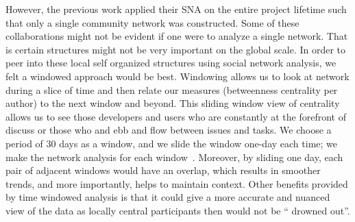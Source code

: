 \documentclass[10pt, conference, compsocconf]{IEEEtran}
\begin{document}
However, the previous work applied their SNA on the entire project
lifetime such that only a single community network was constructed. 
Some of these collaborations might not be evident if one were to
analyze a single network.
That is certain structures might not be very important on the global scale.
In order to peer into these local self organized structures using
social network analysis, we felt a windowed approach would be
best. 
Windowing allows us to look at network during a slice of time
and then relate our measures (betweenness centrality per author) to
the next window and beyond. 
This sliding window view of centrality allows us to see those
developers and users who are constantly at the forefront of discuss or
those who and ebb and flow between issues and tasks.
We choose a period of 30 days as a window, and we slide the window one-day each time; we
make the network analysis for each window~\cite{ICSMwindowed:hindle}. 
Moreover, by sliding one day, each pair of adjacent windows would have
an overlap, which results in smoother trends, and more importantly,
helps to maintain context. 
Other benefits provided by time windowed analysis is that it could
give a more accurate and nuanced view of the data as 
locally central participants then would not be \textquotedblleft
drowned out\textquotedblright. 





\end{document}
